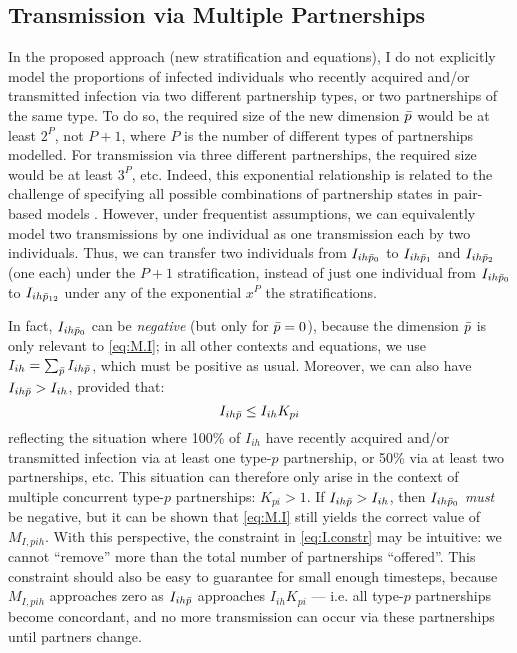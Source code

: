 \subsection{Transmission via Multiple Partnerships}\label{foi.prop.mp}
In the proposed approach (\ie new stratification and equations),
I do not explicitly model the proportions of infected individuals
who recently acquired and/or transmitted infection via two different partnership types,
or two partnerships of the same type.
To do so, the required size of the new dimension $\bar{p}$ would be at least $2^{P}$, not $P+1$,
where $P$ is the number of different types of partnerships modelled.
For transmission via three different partnerships, the required size would be at least $3^P$, etc.
Indeed, this exponential relationship is related to the challenge of
specifying all possible combinations of partnership states in pair-based models \cite{Kretzschmar2017}.
However, under frequentist assumptions, we can equivalently model
two transmissions by one individual as one transmission each by two individuals.
Thus, we can transfer two individuals from $I_{ih\bar{p}_0}$ to
$I_{ih\bar{p}_1}$ and $I_{ih\bar{p}_2}$ (one each) under the $P+1$ stratification,
instead of just one individual from $I_{ih\bar{p}_0}$ to
$I_{ih\bar{p}_{12}}$ under any of the exponential $x^P$ the stratifications.
\par
In fact, $I_{ih\bar{p}_0}$ can be \emph{negative} (but only for $\bar{p} = 0$),
because the dimension $\bar{p}$ is only relevant to \eqref{eq:M.I};
in all other contexts and equations,
we use $I_{ih} = \sum_{\bar{p}} I_{ih\bar{p}}$, which must be positive as usual.
Moreover, we can also have $I_{ih\bar{p}} > I_{ih}$, provided that:
\begin{equation}\label{eq:I.constr}
  I_{ih\bar{p}} \le I_{ih} K_{pi}
\end{equation}
reflecting the situation where 100\% of $I_{ih}$
have recently acquired and/or transmitted infection via at least one type-$p$ partnership,
or 50\% via at least two partnerships, etc.
This situation can therefore only arise in the context of
multiple concurrent type-$p$ partnerships: $K_{pi} > 1$.
If $I_{ih\bar{p}} > I_{ih}$, then $I_{ih\bar{p}_0}$ \emph{must} be negative,
but it can be shown that \eqref{eq:M.I} still yields the correct value of $M_{I,pih}$.
With this perspective, the constraint in \eqref{eq:I.constr} may be intuitive:
we cannot ``remove'' more than the total number of partnerships ``offered''.
This constraint should also be easy to guarantee for small enough timesteps,
because $M_{I,pih}$ approaches zero as $I_{ih\bar{p}}$ approaches $I_{ih} K_{pi}$
--- i.e. all type-$p$ partnerships become \hivp concordant,
and no more transmission can occur via these partnerships until partners change.
